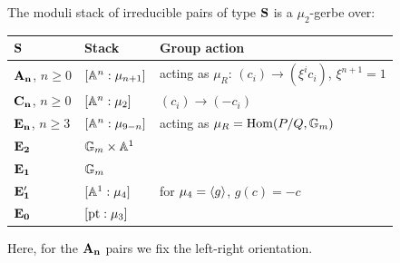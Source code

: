 \documentclass[table,x11names]{amsart}
\begin{document}
 \begin{theorem}\label{thm:irr-comp-stacks}
   The moduli stack of irreducible pairs of type ${\bf S}$ is a
   $\mu_2$-gerbe over:
   \smallskip

   \begin{tabular}{lll}
     ${\bf S}$ & Stack & Group action\\ \hline
     ${\bf A_n}$, $n\ge0$ & $[{\mathbb A}^n : \mu_{n+1}]$
                   & acting as $\mu_R$: $(c_i)\to (\xi^ic_i)$, $\xi^{n+1}=1$\\
     ${\bf C_n}$, $n\ge 0$ & $[{\mathbb A}^n : \mu_2]$ & $(c_i) \to (-c_i)$\\
     ${\bf E_n}$, $n\ge3$ & $[{\mathbb A}^n : \mu_{9-n}]$ & acting as $\mu_R=\operatorname{Hom}(P/Q,{\mathbb G}_m)$\\
     ${\bf E_2}$ & ${\mathbb G}_m \times {\mathbb A}^1$\\
     ${\bf E_1}$ & ${\mathbb G}_m$ \\
     ${\bf E'_1}$ & $[{\mathbb A}^1 : \mu_4]$ & for $\mu_4=\langle g\rangle$, $g(c) = -c$\\
     ${\bf E_0}$ & $[{\rm pt} : \mu_3]$
   \end{tabular}

   \smallskip
   Here, for the ${\bf A_n}$ pairs we fix the left-right orientation.
 \end{theorem}
\end{document}
